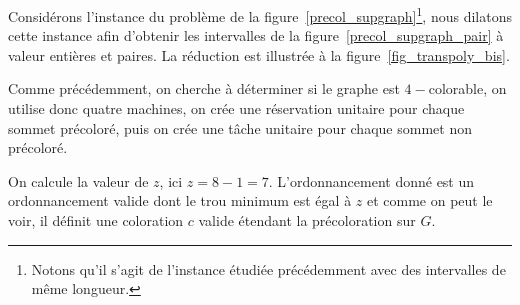 \begin{ex}
    Considérons l'instance du problème de la figure~\ref{precol_supgraph}\footnote{Notons qu'il
    s'agit de l'instance étudiée précédemment avec des intervalles de même longueur.}, nous dilatons
    cette instance afin d'obtenir les intervalles de la figure~\ref{precol_supgraph_pair} à valeur
    entières et paires. La réduction est illustrée à la figure~\ref{fig_transpoly_bis}.

    Comme précédemment, on cherche à déterminer si le graphe est $4-$colorable, on utilise donc
    quatre machines, on crée une réservation unitaire pour chaque sommet précoloré, puis on crée une
    tâche unitaire pour chaque sommet non précoloré.

    On calcule la valeur de $z$, ici $z = 8 - 1 = 7$. L'ordonnancement donné est un ordonnancement
    valide dont le trou minimum est égal à $z$ et comme on peut le voir, il définit une coloration
    $c$ valide étendant la précoloration sur $G$.

\begin{figure}
    \begin{center}
\end{center}
\end{figure}
\end{ex}
